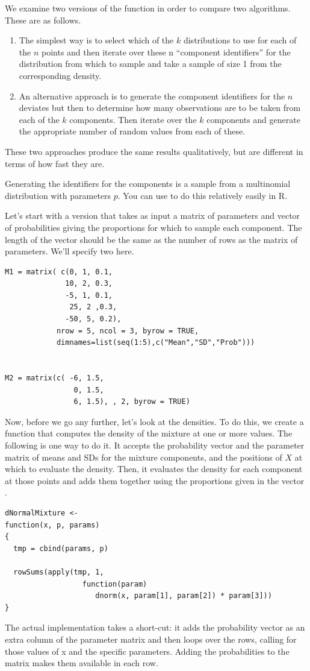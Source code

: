  We examine two versions of the function
 in order to compare two algorithms.
 These are as follows.
 \begin{enumerate}
 \item The simplest way is to select which of the $k$ distributions to
   use for each of the $n$ points and then iterate over these n ``component
   identifiers'' for the distribution from which to sample and take a
   sample of size 1 from the corresponding density.
  
 \item An alternative approach is to generate the component identifiers
   for the $n$ deviates but then to determine how many observations
   are to be taken from each of the $k$ components.  Then iterate over
   the $k$ components and generate the appropriate number of random
   values from each of these.
 \end{enumerate}

 These two approaches produce the same results qualitatively, but 
 are different in terms of how fast they are.

 Generating the identifiers for the components is a sample from
 a multinomial distribution with parameters $p$.  You can use
  to do this relatively easily in R.

  Let's start with a version that takes as input a matrix of
  parameters and vector of probabilities giving the proportions for
  which to sample each component.  The length of the vector should be
  the same as the number of rows as the matrix of parameters.
  We'll specify two here.
{\footnotesize{
\begin{verbatim}
M1 = matrix( c(0, 1, 0.1,
              10, 2, 0.3,
              -5, 1, 0.1,
               25, 2 ,0.3,
              -50, 5, 0.2), 
            nrow = 5, ncol = 3, byrow = TRUE,
            dimnames=list(seq(1:5),c("Mean","SD","Prob")))


M2 = matrix(c( -6, 1.5,
                0, 1.5,
                6, 1.5), , 2, byrow = TRUE)
\end{verbatim}
}}

  Now, before we go any further, let's look at the densities.
  To do this, we create a function that computes the density of the mixture
  at one or more values.  The following is one way to do it.  It
  accepts the probability vector and the parameter matrix of means and
  SDs for the mixture components, and the positions of $X$ at which to
  evaluate the density.  Then, it evaluates the density for each
  component at those points and adds them together using the
  proportions given in the vector .
\begin{verbatim}
dNormalMixture <-
function(x, p, params)
{
  tmp = cbind(params, p)

  rowSums(apply(tmp, 1, 
                  function(param) 
                     dnorm(x, param[1], param[2]) * param[3]))
}
\end{verbatim}
The actual implementation takes a short-cut: it adds the probability
vector as an extra column of the parameter matrix and then loops
over the rows, calling  for those values of x and
the specific parameters.  Adding the probabilities to the matrix
makes them available in each row.

